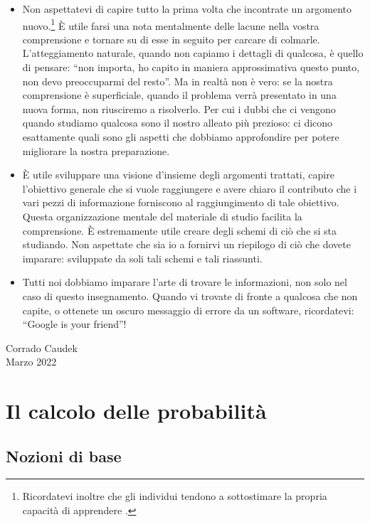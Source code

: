 \documentclass[
  11pt,
]{krantz}
\theoremstyle{definition}
\theoremstyle{definition}
\theoremstyle{definition}
\theoremstyle{definition}
\theoremstyle{remark}
\begin{document}
\begin{itemize}
\item
  Non aspettatevi di capire tutto la prima volta che incontrate un argomento nuovo.\footnote{Ricordatevi inoltre che gli individui tendono a sottostimare la propria capacità di apprendere \citep{horn2021underestimating}.} È utile farsi una nota mentalmente delle lacune nella vostra comprensione e tornare su di esse in seguito per carcare di colmarle. L'atteggiamento naturale, quando non capiamo i dettagli di qualcosa, è quello di pensare: ``non importa, ho capito in maniera approssimativa questo punto, non devo preoccuparmi del resto''. Ma in realtà non è vero: se la nostra comprensione è superficiale, quando il problema verrà presentato in una nuova forma, non riusciremo a risolverlo. Per cui i dubbi che ci vengono quando studiamo qualcosa sono il nostro alleato più prezioso: ci dicono esattamente quali sono gli aspetti che dobbiamo approfondire per potere migliorare la nostra preparazione.
\item
  È utile sviluppare una visione d'insieme degli argomenti trattati, capire l'obiettivo generale che si vuole raggiungere e avere chiaro il contributo che i vari pezzi di informazione forniscono al raggiungimento di tale obiettivo. Questa organizzazione mentale del materiale di studio facilita la comprensione. È estremamente utile creare degli schemi di ciò che si sta studiando. Non aspettate che sia io a fornirvi un riepilogo di ciò che dovete imparare: sviluppate da soli tali schemi e tali riassunti.
\item
  Tutti noi dobbiamo imparare l'arte di trovare le informazioni, non solo nel caso di questo insegnamento. Quando vi trovate di fronte a qualcosa che non capite, o ottenete un oscuro messaggio di errore da un software, ricordatevi: ``Google is your friend''!
\end{itemize}

\begin{flushright}
Corrado Caudek\\
Marzo 2022 \end{flushright}

\mainmatter

\hypertarget{part-il-calcolo-delle-probabilituxe0}{%
\part{Il calcolo delle probabilità}\label{part-il-calcolo-delle-probabilituxe0}}

\hypertarget{intro-prob-1}{%
\chapter{Nozioni di base}\label{intro-prob-1}}
\end{document}
